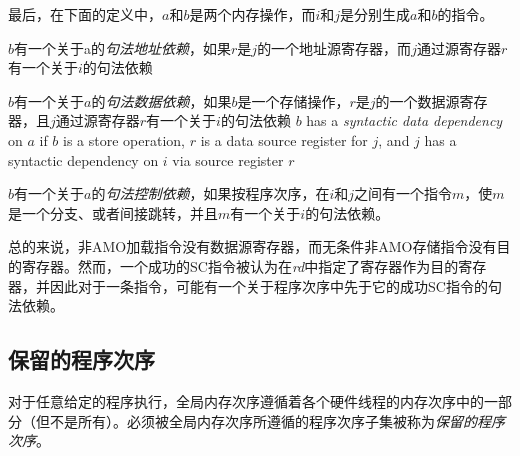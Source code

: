 最后，在下面的定义中，$a$和$b$是两个内存操作，而$i$和$j$是分别生成$a$和$b$的指令。

$b$有一个关于a的{\em 句法地址依赖}，如果$r$是$j$的一个地址源寄存器，而$j$通过源寄存器$r$有一个关于$i$的句法依赖

$b$有一个关于$a$的{\em 句法数据依赖}，如果$b$是一个存储操作，$r$是$j$的一个数据源寄存器，且$j$通过源寄存器$r$有一个关于$i$的句法依赖
$b$ has a {\em syntactic data dependency} on $a$ if $b$ is a store operation, $r$ is a data source register for $j$, and $j$ has a syntactic dependency on $i$ via source register $r$

$b$有一个关于$a$的{\em 句法控制依赖}，如果按程序次序，在$i$和$j$之间有一个指令$m$，使$m$是一个分支、或者间接跳转，并且$m$有一个关于$i$的句法依赖。

\begin{commentary}
  总的来说，非AMO加载指令没有数据源寄存器，而无条件非AMO存储指令没有目的寄存器。然而，一个成功的SC指令被认为在{\em rd}中指定了寄存器作为目的寄存器，并因此对于一条指令，可能有一个关于程序次序中先于它的成功SC指令的句法依赖。
\end{commentary}

\subsection*{保留的程序次序}
对于任意给定的程序执行，全局内存次序遵循着各个硬件线程的内存次序中的一部分（但不是所有）。必须被全局内存次序所遵循的程序次序子集被称为{\em 保留的程序次序}。

